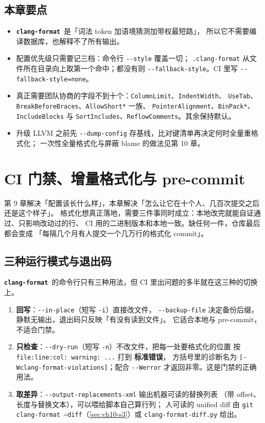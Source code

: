 \documentclass[12pt,a4paper,fontset=fandol]{ctexbook}
\newcommand{\Opt}[1]{\texttt{-\/-#1}}
\newcommand{\Bk}{\discretionary{}{}{}}
\newcommand{\Lib}[1]{\textbf{\texttt{#1}}}
\newcommand{\Fmt}{\Lib{clang-format}}
\begin{document}
\section*{本章要点}
\begin{itemize}
  \item \Fmt\ 是「词法 token 加语境猜测加带权最短路」，
    所以它不需要编译数据库，也解释不了所有输出。
  \item 配置优先级只需要记三档：命令行 \Opt{style} 覆盖一切；
    \texttt{.clang-format} 从文件所在目录向上取第一个命中；都没有则
    \Opt{fallback-style}。CI 里写 \Opt{fallback-style=none}。
  \item 真正需要团队协商的字段不到十个：\texttt{ColumnLimit}、\texttt{IndentWidth}、
    \texttt{UseTab}、\texttt{Break{\Bk}Before{\Bk}Braces}、\texttt{AllowShort*} 一族、
    \texttt{Pointer{\Bk}Alignment}、\texttt{BinPack*}、\texttt{Include{\Bk}Blocks} 与
    \texttt{Sort{\Bk}Includes}、\texttt{Reflow{\Bk}Comments}。其余保持默认。
  \item 升级 LLVM 之前先 \Opt{dump-config} 存基线，比对键清单再决定何时全量重格式化；
    一次性全量格式化与屏蔽 blame 的做法见第 10 章。
\end{itemize}

\chapter{CI 门禁、增量格式化与 pre-commit}\label{ch:format-gate}

第 9 章解决「配置该长什么样」，本章解决「怎么让它在十个人、几百次提交之后还是这个样子」。
格式化想真正落地，需要三件事同时成立：本地改完就能自证通过、只影响改动过的行、
CI 用的二进制版本和本地一致。缺任何一件，仓库最后都会变成
「每隔几个月有人提交一个几万行的格式化 commit」。

\section{三种运行模式与退出码}\label{sec:ch10-s1}

\Fmt\ 的命令行只有三种用法，但 CI 里出问题的多半就在这三种的切换上。

\begin{enumerate}
  \item \textbf{回写}：\Opt{in-place}（短写 \texttt{-i}）直接改文件，
    \Opt{backup-file} 决定备份后缀，静默无输出，退出码只反映「有没有读到文件」。
    它适合本地与 pre-commit，不适合门禁。
  \item \textbf{只检查}：\Opt{dry-run}（短写 \texttt{-n}）不改文件，把每一处要格式化的位置
    按 \texttt{file:line:col: warning: ...} 打到 \textbf{标准错误}，
    方括号里的诊断名为 \texttt{[-Wclang-{\Bk}format-{\Bk}violations]}；配合 \Opt{Werror} 才返回非零。这是门禁的正确用法。
  \item \textbf{取差异}：\Opt{output-{\Bk}replacements-{\Bk}xml} 输出机器可读的替换列表
    （带 offset、长度与替换文本），可以喂给脚本自己算行列；
    人可读的 unified diff 由 \texttt{git clang-format --diff}（\ref{sec:ch10-s3}）或
    \texttt{clang-format-diff.py} 给出。
\end{enumerate}
\end{document}
